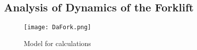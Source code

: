 \documentclass[../report.tex]{subfiles}
\begin{document}
\subsection{Analysis of Dynamics of the Forklift}
\begin{figure}[H]
    \centering
    \texttt{[image: DaFork.png]}
    \caption{Model for calculations}
\end{figure} 
\end{document}
